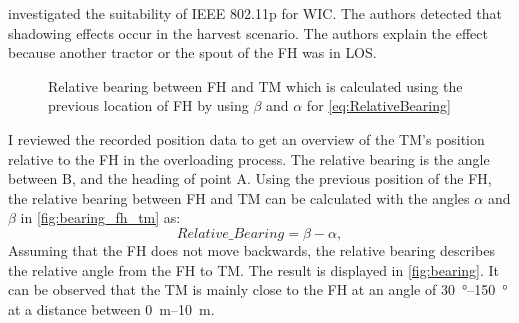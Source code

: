 \textcite{klingler_agriculture_2018} investigated the suitability of IEEE 802.11p for \ac{WIC}. The authors detected that shadowing effects occur in the harvest scenario. The authors explain the effect because another tractor or the spout of the \ac{FH} was in \ac{LOS}.
\begin{figure}%
	\centering
	\caption{Relative bearing between \ac{FH} and \ac{TM} which is calculated using the previous location of \ac{FH} by using $\beta$ and $\alpha$ for \autoref{eq:RelativeBearing}}%
	\label{fig:bearing_fh_tm}%
\end{figure}
I reviewed the recorded position data to get an overview of the \ac{TM}'s position relative to the \ac{FH} in the overloading process. The relative bearing is the angle between B, and the heading of point A. Using the previous position of the \ac{FH}, the relative bearing between \ac{FH} and \ac{TM} can be calculated with the angles $\alpha$ and $\beta$ in \autoref{fig:bearing_fh_tm} as:
\begin{equation}\label{eq:RelativeBearing}
	Relative\_Bearing = \beta - \alpha	,
\end{equation}
Assuming that the \ac{FH} does not move backwards, the relative bearing describes the relative angle from the \ac{FH} to \ac{TM}. The result is displayed in \autoref{fig:bearing}. It can be observed that the \ac{TM} is mainly close to the \ac{FH} at an angle of \SIrange{30}{150}{\degree} at a distance between \SIrange{0}{10}{\metre}. 

